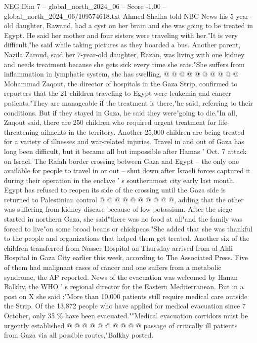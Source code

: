 \begin{textsample}{NEG Dim 7 – global\_north\_2024\_06 – Score -1.00 – global\_north\_2024\_06/109574618.txt}
Ahmed Shalha told NBC News his 5-year-old daughter, Rawand, had a cyst on her brain and she was going to be treated in Egypt.
He said her mother and four sisters were traveling with her."It is very difficult,"he said while taking pictures as they boarded a bus.
Another parent, Nazila Zaroud, said her 7-year-old daughter, Razan, was living with one kidney and needs treatment because she gets sick every time she eats."She suffers from inflammation in lymphatic system, she has swelling, @ @ @ @ @ @ @ @ @ @ Mohammad Zaqout, the director of hospitals in the Gaza Strip, confirmed to reporters that the 21 children traveling to Egypt were leukemia and cancer patients."They are manageable if the treatment is there,"he said, referring to their conditions.
But if they stayed in Gaza, he said they were"going to die."In all, Zaqout said, there are 250 children who required urgent treatment for life-threatening ailments in the territory.
Another 25,000 children are being treated for a variety of illnesses and war-related injuries.
Travel in and out of Gaza has long been difficult, but it became all but impossible after Hamas ' Oct. 7 attack on Israel.
The Rafah border crossing between Gaza and Egypt -- the only one available for people to travel in or out -- shut down after Israeli forces captured it during their operation in the enclave ' s southernmost city early last month.
Egypt has refused to reopen its side of the crossing until the Gaza side is returned to Palestinian control @ @ @ @ @ @ @ @ @ @, adding that the other was suffering from kidney disease because of low potassium.
After the siege started in northern Gaza, she said"there was no food at all"and the family was forced to live"on some broad beans or chickpeas."She added that she was thankful to the people and organizations that helped them get treated.
Another six of the children transferred from Nasser Hospital on Thursday arrived from al-Ahli Hospital in Gaza City earlier this week, according to The Associated Press.
Five of them had malignant cases of cancer and one suffers from a metabolic syndrome, the AP reported.
News of the evacuation was welcomed by Hanan Balkhy, the WHO ' s regional director for the Eastern Mediterranean.
But in a post on X she said :"More than 10,000 patients still require medical care outside the Strip.
Of the 13,872 people who have applied for medical evacuation since 7 October, only 35 \% have been evacuated.""Medical evacuation corridors must be urgently established @ @ @ @ @ @ @ @ @ @ passage of critically ill patients from Gaza via all possible routes,"Balkhy posted.

\end{textsample}
